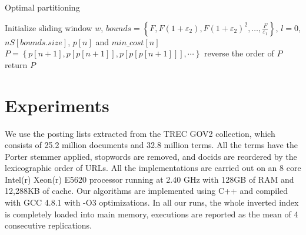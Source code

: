 \documentclass[runningheads,a4paper]{llncs}
\begin{document}
\begin{algorithm} \label{alg: optimal partition}
	\caption{Optimal partitioning}
	Initialize sliding window $ w $, $ bounds=\left\lbrace F,F(1+\varepsilon_2),F(1+\varepsilon_2)^2,\dots, \frac{F}{\varepsilon_1} \right\rbrace $, $ l=0 $, $ nS[bounds.size] $, $p\left[ n \right]$ and $min\_cost \left[n\right] $\;
	$ P=\left\lbrace p\left[n+1\right], p\left[p\left[n+1\right]\right], p\left[p\left[p\left[n+1\right]\right]\right],\cdots\right\rbrace $\;
	reverse the order of $ P $\;
	return $ P $\;
\end{algorithm}

\section{Experiments}
We use the posting lists extracted from the TREC GOV2 collection, which consists of 25.2 million documents and 32.8 million terms. All the terms have the Porter stemmer applied, stopwords are removed, and docids are reordered by the lexicographic order of URLs. All the implementations are carried out on an 8 core Intel(r) Xeon(r) E5620 processor running at 2.40 GHz with 128GB of RAM and 12,288KB of cache. Our algorithms are implemented using C++ and compiled with GCC 4.8.1 with -O3 optimizations. In all our runs, the whole inverted index is completely loaded into main memory, executions are reported as the mean of 4 consecutive replications.
\end{document}
